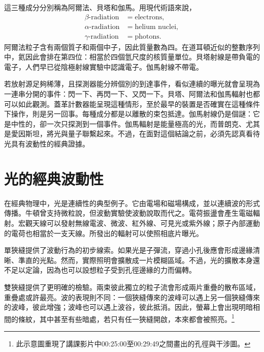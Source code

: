 這三種成分分別稱為阿爾法、貝塔和伽馬。用現代術語來說，
\begin{equation}
\begin{aligned}
\beta\text{-radiation} &= \text{electrons},\\
\alpha\text{-radiation} &= \text{helium nuclei},\\
\gamma\text{-radiation} &= \text{photons}.
\end{aligned}
\end{equation}
阿爾法粒子含有兩個質子和兩個中子，因此質量數為四。在道耳頓近似的整數序列中，氦因此會排在第四位：相當於四個氫尺度的核質量單位。貝塔射線是帶負電的電子，人們早已從陰極射線實驗中認識電子。伽馬射線不帶電。

若放射源足夠稀薄，且探測器能分辨個別的到達事件，看似連續的曝光就會呈現為一連串分開的事件：閃一下、再閃一下、又閃一下。貝塔、阿爾法和伽馬輻射也都可以如此觀測。蓋革計數器能呈現這種情形，至於最早的裝置是否確實在這種條件下操作，則是另一回事。每種成分都是以離散的束包抵達。伽馬射線仍是個謎：它是中性的，卻一次只探測到一個事件。伽馬輻射是能量極高的光，而普朗克、尤其是愛因斯坦，將光與量子聯繫起來。不過，在面對這個結論之前，必須先認真看待光具有波動性的經典證據。

\section{光的經典波動性}

在經典物理中，光是連續性的典型例子。它由電場和磁場構成，並以連續波的形式傳播。牛頓曾支持微粒說，但波動實驗使波動說取而代之。電荷振盪會產生電磁輻射。宏觀天線可以發射無線電波、微波、紅外線、可見光或紫外線；原子內部運動的電荷也相當於一支天線。所發出的輻射可以使照相底片曝光。

單狹縫提供了波動行為的初步線索。如果光是子彈流，穿過小孔後應會形成邊緣清晰、準直的光點。然而，實際照明會擴散成一片模糊區域。不過，光的擴散本身還不足以定論，因為也可以設想粒子受到孔徑邊緣的力而偏轉。

雙狹縫提供了更明確的檢驗。兩束彼此獨立的粒子流會形成兩片重疊的散布區域，重疊處或許最亮。波的表現則不同：一個狹縫傳來的波峰可以遇上另一個狹縫傳來的波峰，彼此增強；波峰也可以遇上波谷，彼此抵消。因此，螢幕上會出現明暗相間的條紋，其中甚至有些暗處，若只有任一狹縫開啟，本來都會被照亮。\footnote{此示意圖重現了講課影片中00:25:00至00:29:49之間畫出的孔徑與干涉圖。}


